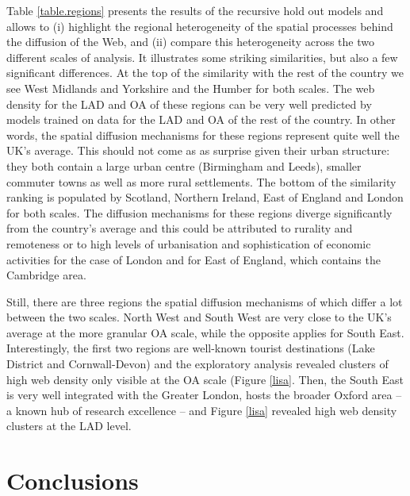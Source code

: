 \documentclass[
  authoryear,
  preprint,
  3p]{elsarticle}
\begin{document}
Table \ref{table.regions} presents the results of the recursive hold out
models and allows to (i) highlight the regional heterogeneity of the
spatial processes behind the diffusion of the Web, and (ii) compare this
heterogeneity across the two different scales of analysis. It
illustrates some striking similarities, but also a few significant
differences. At the top of the similarity with the rest of the country
we see West Midlands and Yorkshire and the Humber for both scales. The
web density for the LAD and OA of these regions can be very well
predicted by models trained on data for the LAD and OA of the rest of
the country. In other words, the spatial diffusion mechanisms for these
regions represent quite well the UK's average. This should not come as
as surprise given their urban structure: they both contain a large urban
centre (Birmingham and Leeds), smaller commuter towns as well as more
rural settlements. The bottom of the similarity ranking is populated by
Scotland, Northern Ireland, East of England and London for both scales.
The diffusion mechanisms for these regions diverge significantly from
the country's average and this could be attributed to rurality and
remoteness or to high levels of urbanisation and sophistication of
economic activities for the case of London and for East of England,
which contains the Cambridge area.

Still, there are three regions the spatial diffusion mechanisms of which
differ a lot between the two scales. North West and South West are very
close to the UK's average at the more granular OA scale, while the
opposite applies for South East. Interestingly, the first two regions
are well-known tourist destinations (Lake District and Cornwall-Devon)
and the exploratory analysis revealed clusters of high web density only
visible at the OA scale (Figure \ref{lisa}. Then, the South East is very
well integrated with the Greater London, hosts the broader Oxford area
-- a known hub of research excellence -- and Figure \ref{lisa} revealed
high web density clusters at the LAD level.

\section{Conclusions}\label{sec-conclusions}
\end{document}
